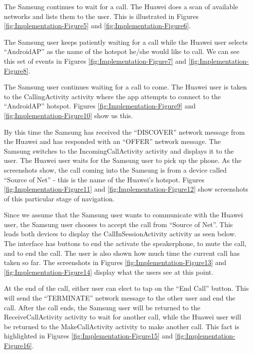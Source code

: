 \documentclass[12pt,svgnames,smaller]{article} %
\begin{document}
		The Samsung continues to wait for a call. The Huawei does a scan of available networks and lists them to the user. This is illustrated in Figures \ref{fig:Implementation-Figure5} and \ref{fig:Implementation-Figure6}.
		
		The Samsung user keeps patiently waiting for a call while the Huawei user selects “AndroidAP” as the name of the hotspot he/she would like to call. We can see this set of events in Figures \ref{fig:Implementation-Figure7} and \ref{fig:Implementation-Figure8}.
		
		The Samsung user continues waiting for a call to come. The Huawei user is taken to the CallingActivity activity where the app attempts to connect to the “AndroidAP” hotspot. Figures \ref{fig:Implementation-Figure9} and \ref{fig:Implementation-Figure10} show us this.
		
		By this time the Samsung has received the “DISCOVER” network message from the Huawei and has responded with an “OFFER” network message. The Samsung switches to the IncomingCallActivity activity and displays it to the user. The Huawei user waits for the Samsung user to pick up the phone. As the screenshots show, the call coming into the Samsung is from a device called “Source of Net” - this is the name of the Huawei’s hotspot. Figures \ref{fig:Implementation-Figure11} and \ref{fig:Implementation-Figure12} show screenshots of this particular stage of navigation.
		
		Since we assume that the Samsung user wants to communicate with the Huawei user, the Samsung user chooses to accept the call from “Source of Net”. This leads both devices to display the CallInSessionActivity activity as seen below. The interface has buttons to end the activate the speakerphone, to mute the call, and to end the call. The user is also shown how much time the current call has taken so far. The screenshots in Figures \ref{fig:Implementation-Figure13} and \ref{fig:Implementation-Figure14} display what the users see at this point.
		
		At the end of the call, either user can elect to tap on the “End Call” button. This will send the “TERMINATE” network message to the other user and end the call. After the call ends, the Samsung user will be returned to the ReceiveCallActivity activity to wait for another call, while the Huawei user will be returned to the MakeCallActivity activity to make another call. This fact is highlighted in Figures \ref{fig:Implementation-Figure15} and \ref{fig:Implementation-Figure16}.
		
\end{document}
